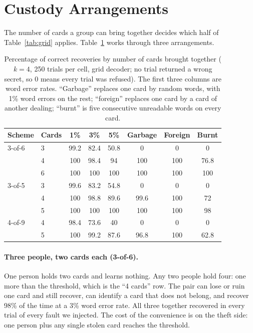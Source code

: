 \documentclass[numeric]{anvil-paper}
\begin{document}
\section{Custody Arrangements}
\label{sec:scenarios}

The number of cards a group can bring together decides which half of
Table~\ref{tab:grid} applies. Table~\ref{tab:scen} works through three
arrangements.

\begin{table}[!htb]
\centering
\caption{Percentage of correct recoveries by number of cards brought together
($k=4$, 250 trials per cell, grid decoder; no trial returned a wrong secret,
so 0 means every trial was refused). The first three columns are word error
rates. ``Garbage'' replaces one card by random words, with 1\% word errors on
the rest; ``foreign'' replaces one card by a card of another dealing;
``burnt'' is five consecutive unreadable words on every card.}
\label{tab:scen}
\small
\begin{tabular}{llcccccc}
\toprule
Scheme & Cards & 1\% & 3\% & 5\% & Garbage & Foreign & Burnt \\
\midrule
3-of-6 & 3 & 99.2 & 82.4 & 50.8 & 0 & 0 & 0 \\
 & 4 & 100 & 98.4 & 94 & 100 & 100 & 76.8 \\
 & 6 & 100 & 100 & 100 & 100 & 100 & 100 \\
\midrule
3-of-5 & 3 & 99.6 & 83.2 & 54.8 & 0 & 0 & 0 \\
 & 4 & 100 & 98.8 & 89.6 & 99.6 & 100 & 72 \\
 & 5 & 100 & 100 & 100 & 100 & 100 & 98 \\
\midrule
4-of-9 & 4 & 98.4 & 73.6 & 40 & 0 & 0 & 0 \\
 & 5 & 100 & 99.2 & 87.6 & 96.8 & 100 & 62.8 \\
\bottomrule
\end{tabular}
\end{table}

\paragraph{Three people, two cards each (3-of-6).}
One person holds two cards and learns nothing. Any two people hold four: one
more than the threshold, which is the ``4 cards'' row. The pair can lose or
ruin one card and still recover, can identify a card that does not belong, and
recover 98\% of the time at a 3\% word error rate. All three together recovered
in every trial of every fault we injected. The cost of the convenience is on
the theft side: one person plus any single stolen card reaches the threshold.
\end{document}
